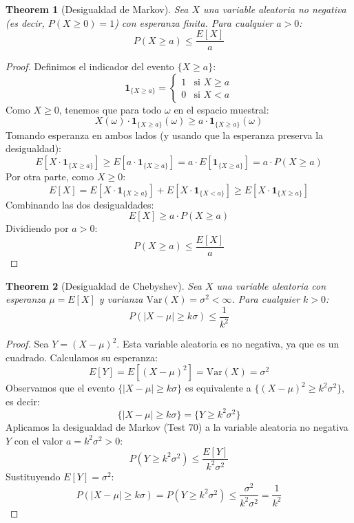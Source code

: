 \documentclass[11pt,a4paper]{article}
\theoremstyle{plain}
\newtheorem{theorem}{Theorem}[section]
\theoremstyle{definition}
\begin{document}
\begin{theorem}[Desigualdad de Markov]
Sea $X$ una variable aleatoria no negativa (es decir, $P(X \geq 0) = 1$) con esperanza finita. Para cualquier $a > 0$:
\[
P(X \geq a) \leq \frac{E[X]}{a}
\]
\end{theorem}

\begin{proof}
Definimos el indicador del evento $\{X \geq a\}$:
\[
\mathbf{1}_{\{X \geq a\}} = \begin{cases} 1 & \text{si } X \geq a \\ 0 & \text{si } X < a \end{cases}
\]
Como $X \geq 0$, tenemos que para todo $\omega$ en el espacio muestral:
\[
X(\omega) \cdot \mathbf{1}_{\{X \geq a\}}(\omega) \geq a \cdot \mathbf{1}_{\{X \geq a\}}(\omega)
\]
Tomando esperanza en ambos lados (y usando que la esperanza preserva la desigualdad):
\[
E\left[X \cdot \mathbf{1}_{\{X \geq a\}}\right] \geq E\left[a \cdot \mathbf{1}_{\{X \geq a\}}\right] = a \cdot E\left[\mathbf{1}_{\{X \geq a\}}\right] = a \cdot P(X \geq a)
\]
Por otra parte, como $X \geq 0$:
\[
E[X] = E\left[X \cdot \mathbf{1}_{\{X \geq a\}}\right] + E\left[X \cdot \mathbf{1}_{\{X < a\}}\right] \geq E\left[X \cdot \mathbf{1}_{\{X \geq a\}}\right]
\]
Combinando las dos desigualdades:
\[
E[X] \geq a \cdot P(X \geq a)
\]
Dividiendo por $a > 0$:
\[
P(X \geq a) \leq \frac{E[X]}{a}
\]
\end{proof}

\begin{theorem}[Desigualdad de Chebyshev]
Sea $X$ una variable aleatoria con esperanza $\mu = E[X]$ y varianza $\text{Var}(X) = \sigma^2 < \infty$. Para cualquier $k > 0$:
\[
P(|X - \mu| \geq k\sigma) \leq \frac{1}{k^2}
\]
\end{theorem}

\begin{proof}
Sea $Y = (X - \mu)^2$. Esta variable aleatoria es no negativa, ya que es un cuadrado. Calculamos su esperanza:
\[
E[Y] = E[(X - \mu)^2] = \text{Var}(X) = \sigma^2
\]
Observamos que el evento $\{|X - \mu| \geq k\sigma\}$ es equivalente a $\{(X - \mu)^2 \geq k^2\sigma^2\}$, es decir:
\[
\{|X - \mu| \geq k\sigma\} = \{Y \geq k^2\sigma^2\}
\]
Aplicamos la desigualdad de Markov (Test 70) a la variable aleatoria no negativa $Y$ con el valor $a = k^2\sigma^2 > 0$:
\[
P(Y \geq k^2\sigma^2) \leq \frac{E[Y]}{k^2\sigma^2}
\]
Sustituyendo $E[Y] = \sigma^2$:
\[
P(|X - \mu| \geq k\sigma) = P(Y \geq k^2\sigma^2) \leq \frac{\sigma^2}{k^2\sigma^2} = \frac{1}{k^2}
\]
\end{proof}
\end{document}
